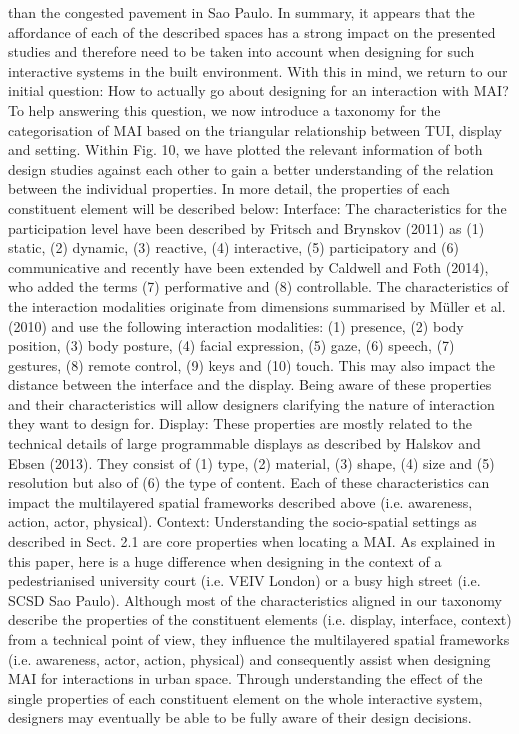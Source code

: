 than the congested pavement in Sao Paulo.
In summary, it appears that the affordance of each of the described spaces has a
strong impact on the presented studies and therefore need to be taken into account
when designing for such interactive systems in the built environment. With this in
mind, we return to our initial question: How to actually go about designing for an
interaction with MAI? To help answering this question, we now introduce a taxonomy
for the categorisation of MAI based on the triangular relationship between
TUI, display and setting. Within Fig. 10, we have plotted the relevant information
of both design studies against each other to gain a better understanding of the relation
between the individual properties.
In more detail, the properties of each constituent element will be described
below:
Interface: The characteristics for the participation level have been described by
Fritsch and Brynskov (2011) as (1) static, (2) dynamic, (3) reactive, (4) interactive,
(5) participatory and (6) communicative and recently have been extended by Caldwell and Foth (2014), who added the terms (7) performative and (8) controllable.
The characteristics of the interaction modalities originate from dimensions
summarised by Müller et al. (2010) and use the following interaction modalities:
(1) presence, (2) body position, (3) body posture, (4) facial expression, (5) gaze,
(6) speech, (7) gestures, (8) remote control, (9) keys and (10) touch. This may also
impact the distance between the interface and the display. Being aware of these
properties and their characteristics will allow designers clarifying the nature of
interaction they want to design for.
Display: These properties are mostly related to the technical details of large
programmable displays as described by Halskov and Ebsen (2013). They consist
of (1) type, (2) material, (3) shape, (4) size and (5) resolution but also of (6) the
type of content. Each of these characteristics can impact the multilayered spatial
frameworks described above (i.e. awareness, action, actor, physical).
Context: Understanding the socio-spatial settings as described in Sect. 2.1 are
core properties when locating a MAI. As explained in this paper, here is a huge
difference when designing in the context of a pedestrianised university court (i.e.
VEIV London) or a busy high street (i.e. SCSD Sao Paulo).
Although most of the characteristics aligned in our taxonomy describe the
properties of the constituent elements (i.e. display, interface, context) from a technical
point of view, they influence the multilayered spatial frameworks (i.e. awareness,
actor, action, physical) and consequently assist when designing MAI for
interactions in urban space. Through understanding the effect of the single properties
of each constituent element on the whole interactive system, designers may
eventually be able to be fully aware of their design decisions.


